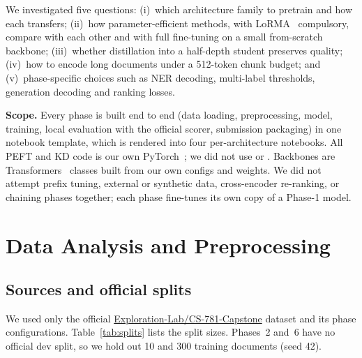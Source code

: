 \documentclass[11pt, oneside]{article}
\newcommand{\tsc}[1]{\texttt{\detokenize{#1}}}
\begin{document}
We investigated five questions: (i)~which architecture family to pretrain and how each transfers; (ii)~how parameter-efficient methods, with LoRMA~\cite{bihany2025lorma} compulsory, compare with each other and with full fine-tuning on a small from-scratch backbone; (iii)~whether distillation into a half-depth student preserves quality; (iv)~how to encode long documents under a 512-token chunk budget; and (v)~phase-specific choices such as NER decoding, multi-label thresholds, generation decoding and ranking losses.

\textbf{Scope.} Every phase is built end to end (data loading, preprocessing, model, training, local evaluation with the official scorer, submission packaging) in one notebook template, which is rendered into four per-architecture notebooks. All PEFT and KD code is our own PyTorch~\cite{paszke2019pytorch}; we did not use \tsc{peft} or \tsc{bitsandbytes}. Backbones are Transformers~\cite{wolf2020transformers} classes built from our own configs and weights. We did not attempt prefix tuning, external or synthetic data, cross-encoder re-ranking, or chaining phases together; each phase fine-tunes its own copy of a Phase-1 model.

\section{Data Analysis and Preprocessing}\label{sec:data}
\subsection{Sources and official splits}
We used only the official \url{Exploration-Lab/CS-781-Capstone} dataset and its phase configurations. Table~\ref{tab:splits} lists the split sizes. Phases~2 and~6 have no official dev split, so we hold out 10 and 300 training documents (seed 42).
\end{document}
